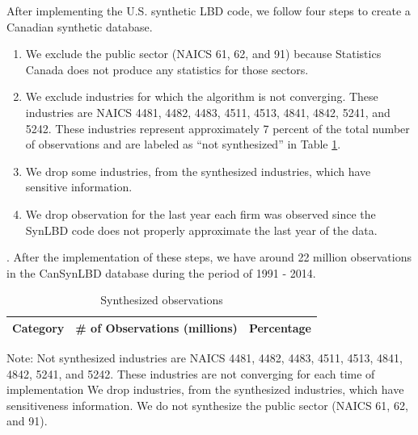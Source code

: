 \documentclass{article}
\begin{document}


After implementing the U.S. synthetic LBD code, we follow four steps to create a Canadian synthetic database. \begin{enumerate}
    \item We exclude the public sector (NAICS 61, 62, and 91) because Statistics Canada does not produce any statistics for those sectors.
    \item We exclude industries for which the algorithm is not converging.%
    These industries are NAICS 4481,    4482,     4483,     4511,     4513,     4841,     4842,     5241, and 5242. These industries represent approximately 7 percent of the total number of observations and are labeled as ``not synthesized'' in Table \ref{Synthesized_observations}.
    \item We drop some industries, from the synthesized industries, which have sensitive information.
    \item We drop observation for the last year each firm was observed since the SynLBD code does not properly approximate the last year of the data.
\end{enumerate}. 
After the implementation of these steps, we have around 22 million observations in the CanSynLBD database during the period of 1991 - 2014.

\begin{table}[H]
  \centering
\begin{threeparttable}
  \caption{Synthesized observations}  \label{Synthesized_observations} \medskip
  \renewcommand{\arraystretch}{1}
  \begin{tabular}{l  c c }
    \toprule
    \textbf{Category}&\textbf{\# of Observations (millions)}&\textbf{Percentage}\\
    \midrule

   \bottomrule
  \end{tabular} 
\begin{tablenotes}
\small
\item Note: Not synthesized industries are NAICS 4481,    4482,     4483,     4511,     4513,     4841,     4842,     5241, and 5242. These industries are not converging for each time of implementation We drop industries, from the synthesized industries, which have sensitiveness information. We do not synthesize the public sector (NAICS 61, 62, and 91).
 \end{tablenotes}
 \end{threeparttable}
\end{table}
\end{document}

